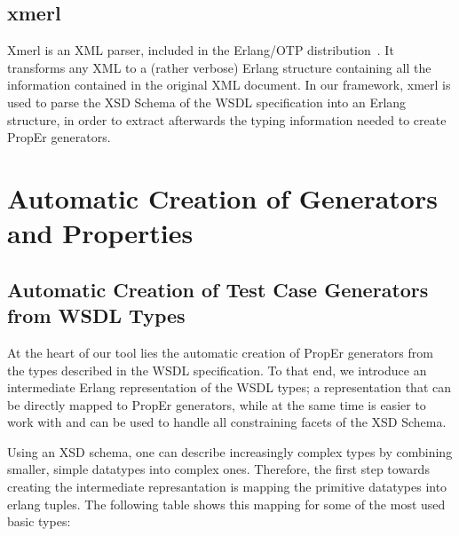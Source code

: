 \documentclass[submission,copyright,a4]{eptcs}
\begin{document}
\subsection{xmerl}

Xmerl is an XML parser, included in the Erlang/OTP distribution~\cite{xmerl}.
It transforms any XML to a (rather verbose) Erlang structure containing all the 
information contained in the original XML document. In our framework, xmerl is 
used to parse the XSD Schema of the WSDL specification into an Erlang structure, in 
order to extract afterwards the typing information needed to create PropEr generators.

\section{Automatic Creation of Generators and Properties} \label{sec:automatic}

\subsection{Automatic Creation of Test Case Generators from WSDL Types}

At the heart of our tool lies the automatic creation of PropEr generators from 
the types described in the WSDL specification. To that end, we introduce an 
intermediate Erlang representation of the WSDL types; a representation that can 
be directly mapped to PropEr generators, while at the same time is easier to work 
with and can be used to handle all constraining facets of the XSD Schema. 

Using an XSD schema, one can describe increasingly complex types by combining
smaller, simple datatypes into complex ones. Therefore, the first step towards 
creating the intermediate represantation is mapping the primitive datatypes 
into erlang tuples. The following table shows this mapping for some of the
most used basic types:
\end{document}
